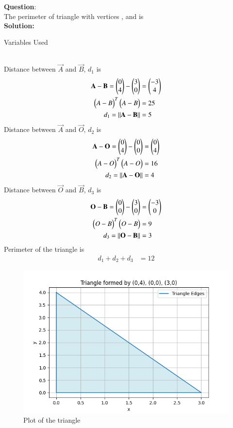 \documentclass[journal]{IEEEtran}
\begin{document}
\textbf{Question}:\\
The perimeter of triangle with vertices , and  is
\\
\textbf{Solution: }
\begin{table}[h!]    
  \centering
  
  \caption{Variables Used}
  \label{tab10.5.3.9.1}
\end{table}\\
Distance between $\vec{A}$ and $\vec{B}$, $d_1$ is
\begin{align}
    \mathbf{A} - \mathbf{B} = \begin{pmatrix}0\\4\end{pmatrix} - \begin{pmatrix}3\\0\end{pmatrix} &= \begin{pmatrix}-3\\4\end{pmatrix}\\
    \begin{pmatrix}A-B\end{pmatrix}^T\begin{pmatrix}A-B\end{pmatrix}&=25\\
    d_1=||\mathbf{A}-\mathbf{B}||&=5
\end{align}
Distance between $\vec{A}$ and $\vec{O}$, $d_2$ is
\begin{align}
    \mathbf{A} - \mathbf{O} = \begin{pmatrix}0\\4\end{pmatrix} - \begin{pmatrix}0\\0\end{pmatrix} &= \begin{pmatrix}0\\4\end{pmatrix}\\
    \begin{pmatrix}A-O\end{pmatrix}^T\begin{pmatrix}A-O\end{pmatrix}&=16\\
    d_2=||\mathbf{A}-\mathbf{O}||&=4
\end{align}
Distance between $\vec{O}$ and $\vec{B}$, $d_3$ is
\begin{align}
    \mathbf{O} - \mathbf{B} = \begin{pmatrix}0\\0\end{pmatrix} - \begin{pmatrix}3\\0\end{pmatrix} &= \begin{pmatrix}-3\\0\end{pmatrix}\\
    \begin{pmatrix}O-B\end{pmatrix}^T\begin{pmatrix}O-B\end{pmatrix}&=9\\
    d_3=||\mathbf{O}-\mathbf{B}||&=3
\end{align}
Perimeter of the triangle is 
\begin{align}
    d_1+d_2+d_3&=12
\end{align}
\begin{figure}[h!]
   \centering
   \includegraphics[width=0.7\linewidth]{figs/fig.png}
   \caption{Plot of the triangle}
   \label{stemplot}
\end{figure}
\end{document}

